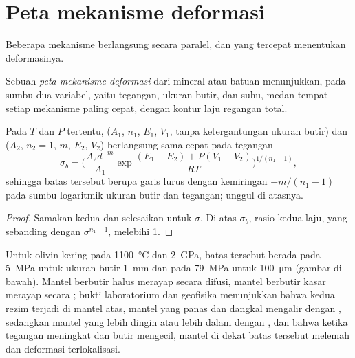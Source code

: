 \section{Peta mekanisme deformasi}

Beberapa mekanisme berlangsung secara paralel, dan yang tercepat menentukan deformasinya.

\begin{definition}\label{def:b3:deformation-mechanisms:deformation-map}
Sebuah \emph{peta mekanisme deformasi} dari
mineral atau batuan menunjukkan, pada sumbu dua variabel, yaitu tegangan, ukuran butir, dan
suhu, medan tempat setiap mekanisme paling cepat, dengan kontur
laju regangan total.
\end{definition}

\begin{proposition}\label{prop:b3:deformation-mechanisms:boundary}
Pada $T$ dan $P$ tertentu,  ($A_1$, $n_1$, $E_1$, $V_1$, tanpa
ketergantungan ukuran butir) dan  ($A_2$, $n_2 = 1$, $m$, $E_2$, $V_2$)
berlangsung sama cepat pada tegangan
\[
  \sigma_b = \biggl(\frac{A_2d^{-m}}{A_1}
  \exp\frac{(E_1 - E_2) + P(V_1 - V_2)}{RT}\biggr)^{1/(n_1 - 1)} ,
\]
sehingga batas tersebut berupa garis lurus dengan kemiringan $-m/(n_1 - 1)$ pada sumbu logaritmik
ukuran butir dan tegangan;  unggul di atasnya.
\end{proposition}

\begin{proof}
Samakan kedua  dan selesaikan untuk $\sigma$. Di atas $\sigma_b$, rasio kedua laju,
yang sebanding dengan $\sigma^{n_1 - 1}$, melebihi 1.
\end{proof}

Untuk olivin kering pada \qty{1100}{\celsius} dan \qty{2}{GPa}, batas tersebut berada pada
\qty{5}{MPa} untuk ukuran butir \qty{1}{mm} dan pada \qty{79}{MPa} untuk
\qty{100}{\micro m} (gambar di bawah). Mantel berbutir halus merayap secara difusi,
mantel berbutir kasar merayap secara ; bukti laboratorium dan geofisika menunjukkan
bahwa kedua rezim terjadi di mantel atas, mantel yang panas dan dangkal mengalir dengan
, sedangkan mantel yang lebih dingin atau lebih dalam dengan , dan bahwa
ketika tegangan meningkat dan butir mengecil, mantel di dekat batas tersebut melemah
dan deformasi terlokalisasi.

